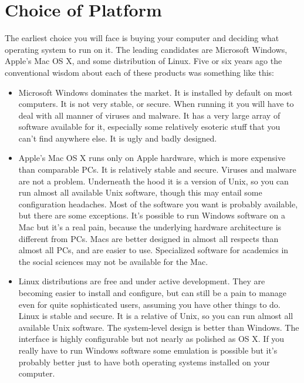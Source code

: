 \documentclass[11pt,article,oneside]{memoir}
\begin{document}
\section{Choice of Platform}

The earliest choice you will face is buying your computer and deciding what operating system to run on it. The leading candidates are Microsoft Windows, Apple's Mac OS X, and some distribution of Linux. Five or six years ago the conventional wisdom about each of these products was something like this:  
                                                                                      
\begin{itemize}
	\item Microsoft Windows dominates the market. It is installed by default on most computers. It is not very stable, or secure. When running it you will have to deal with all manner of viruses and malware. It has a very large array of software available for it, especially some relatively esoteric stuff that you can't find anywhere else. It is ugly and badly designed. 
	\item Apple's Mac OS X runs only on Apple hardware, which is more expensive than comparable PCs. It is relatively stable and secure. Viruses and malware are not a problem. Underneath the hood it is a version of Unix, so you can run almost all available Unix software, though this may entail some configuration headaches. Most of the software you want is probably available, but there are some exceptions. It's possible to run Windows software on a Mac but it's a real pain, because the underlying hardware architecture is different from PCs. Macs are better designed in almost all respects than almost all PCs, and are easier to use. Specialized software for academics in the social sciences may not be available for the Mac. 
	\item Linux distributions are free and under active development. They are becoming easier to install and configure, but can still be a pain to manage even for quite sophisticated users, assuming you have other things to do. Linux is stable and secure. It is a relative of Unix, so you can run almost all available Unix software. The system-level design is better than Windows. The interface is highly configurable but not nearly as polished as OS X. If you really have to run Windows software some emulation is possible but it's probably better just to have both operating systems installed on your computer. 
\end{itemize}
\end{document}
